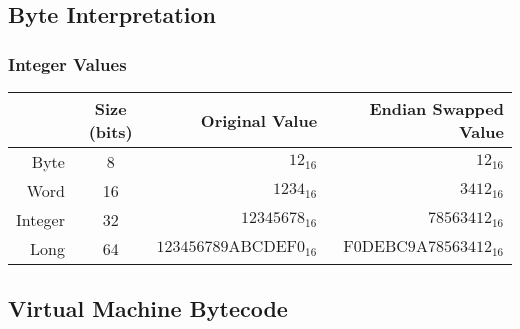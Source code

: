 \subsection {Byte Interpretation}

\subsubsection{Integer Values}

\begin{center}
  \begin{tabular}{ r | c r r }
  	        & Size (bits) & Original Value                   & Endian Swapped Value             \\ \hline
  	Byte    & 8           & $12_{16}$                        & $12_{16}$                        \\
  	Word    & 16          & $1234_{16}$                      & $3412_{16}$                      \\
  	Integer & 32          & $12345678_{16}$                  & $78563412_{16}$                  \\
  	Long    & 64          & $\mathrm{123456789ABCDEF0}_{16}$ & $\mathrm{F0DEBC9A78563412}_{16}$
  \end{tabular}
\end{center}

\subsection{Virtual Machine Bytecode}

